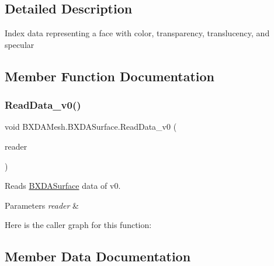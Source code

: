 \subsection{Detailed Description}
Index data representing a face with color, transparency, translucency, and specular 



\subsection{Member Function Documentation}
\mbox{\label{class_b_x_d_a_mesh_1_1_b_x_d_a_surface_a05ef413dafc79022f79763330340e61d}} 
\subsubsection{\texorpdfstring{Read\+Data\+\_\+v0()}{ReadData\_v0()}}
{\footnotesize\ttfamily void B\+X\+D\+A\+Mesh.\+B\+X\+D\+A\+Surface.\+Read\+Data\+\_\+v0 (\begin{DoxyParamCaption}\item[{Binary\+Reader}]{reader }\end{DoxyParamCaption})}



Reads \hyperlink{class_b_x_d_a_mesh_1_1_b_x_d_a_surface}{B\+X\+D\+A\+Surface} data of v0. 


\begin{DoxyParams}{Parameters}
{\em reader} & \\
\hline
\end{DoxyParams}
Here is the caller graph for this function\+:


\subsection{Member Data Documentation}
\mbox{\label{class_b_x_d_a_mesh_1_1_b_x_d_a_surface_ae7b70c2da6c489de054138dfa083e98a}} 
